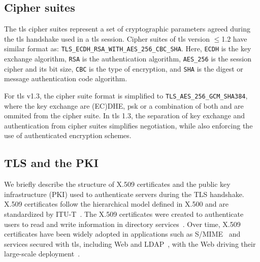 

\subsection{Cipher suites}
\label{subsec:background-tls-ciphers}
The \gls{tls} cipher suites represent a set of cryptographic parameters agreed during the \gls{tls} handshake used in a \gls{tls} session.
Cipher suites of \gls{tls} version $\leq$1.2 have similar format as: \texttt{TLS\_ECDH\_RSA\_WITH\_AES\_256\_CBC\_SHA}. Here, \texttt{ECDH} is the key exchange algorithm, \texttt{RSA} is the authentication algorithm, \texttt{AES\_256} is the session cipher and its bit size, \texttt{CBC} is the type of encryption, and \texttt{SHA} is the digest or message authentication code algorithm.

For \gls{tls} v1.3, the cipher suite format is simplified to \texttt{TLS\_AES\_256\_GCM\_SHA384}, where the key exchange are (EC)DHE, \gls{psk} or a combination of both and are ommited from the cipher suite.
In \gls{tls} 1.3, the separation of key exchange and authentication from cipher suites simplifies negotiation, while also enforcing the use of authenticated encryption schemes.

\subsection{TLS and the PKI}
\label{subsec:background-tls-pki}
We briefly describe the structure of X.509 certificates and the public key infrastructure (PKI) used to authenticate servers during the TLS handshake.
X.509 certificates follow the hierarchical model defined in X.500 and are standardized by ITU-T~\cite{itu-t-x509}.
The X.509 certificates were created to authenticate users to read and write information in directory services~\cite{holz-dissertation}.
Over time, X.509 certificates have been widely adopted in applications such as S/MIME~\cite{OndaroEtAl_MINECollectingAnalyzing_2025} and services secured with \gls{tls}, including Web and LDAP~\cite{gustavo-ldap2}, with the Web driving their large-scale deployment~\cite{holz2020}.

